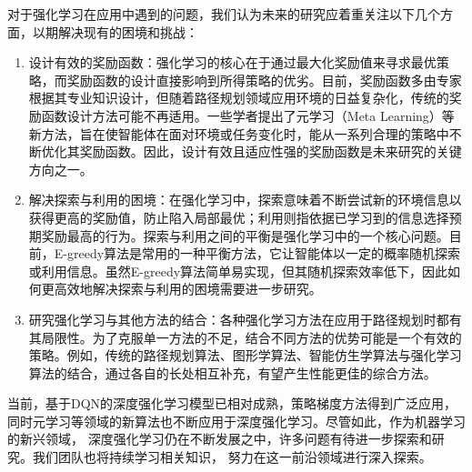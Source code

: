 \documentclass{thuemp}
\begin{document}
对于强化学习在应用中遇到的问题，我们认为未来的研究应着重关注以下几个方面，以期解决现有的困境和挑战：
\begin{enumerate}
  \item 设计有效的奖励函数：强化学习的核心在于通过最大化奖励值来寻求最优策略，而奖励函数的设计直接影响到所得策略的优劣。目前，奖励函数多由专家根据其专业知识设计，但随着路径规划领域应用环境的日益复杂化，传统的奖励函数设计方法可能不再适用。一些学者提出了元学习（Meta Learning）等新方法，旨在使智能体在面对环境或任务变化时，能从一系列合理的策略中不断优化其奖励函数。因此，设计有效且适应性强的奖励函数是未来研究的关键方向之一。
  \item 解决探索与利用的困境：在强化学习中，探索意味着不断尝试新的环境信息以获得更高的奖励值，防止陷入局部最优；利用则指依据已学习到的信息选择预期奖励最高的行为。探索与利用之间的平衡是强化学习中的一个核心问题。目前，E-greedy算法是常用的一种平衡方法，它让智能体以一定的概率随机探索或利用信息。虽然E-greedy算法简单易实现，但其随机探索效率低下，因此如何更高效地解决探索与利用的困境需要进一步研究。
  \item 研究强化学习与其他方法的结合：各种强化学习方法在应用于路径规划时都有其局限性。为了克服单一方法的不足，结合不同方法的优势可能是一个有效的策略。例如，传统的路径规划算法、图形学算法、智能仿生学算法与强化学习算法的结合，通过各自的长处相互补充，有望产生性能更佳的综合方法。
\end{enumerate}

当前，基于DQN的深度强化学习模型已相对成熟，策略梯度方法得到广泛应用，
同时元学习等领域的新算法也不断应用于深度强化学习。尽管如此，作为机器学习的新兴领域，
深度强化学习仍在不断发展之中，许多问题有待进一步探索和研究。我们团队也将持续学习相关知识，
努力在这一前沿领域进行深入探索。



\end{document}

